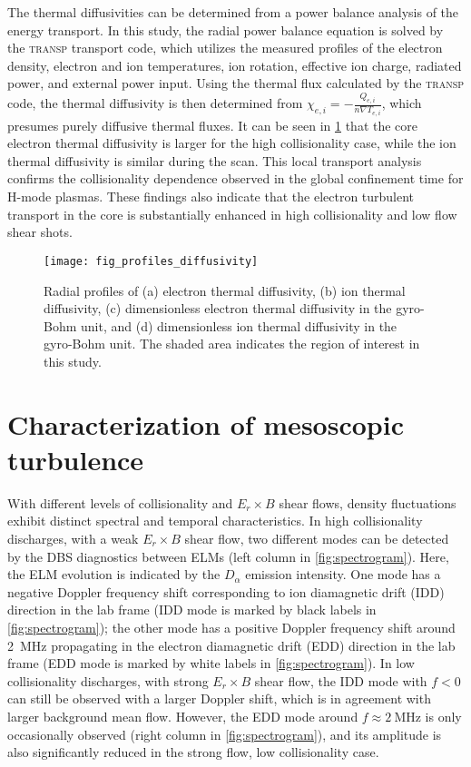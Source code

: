 \documentclass[english,aip,pop,superscriptaddress,preprint,letterpaper]{revtex4-2}
\begin{document}
The thermal diffusivities can be determined from a power balance analysis of the energy transport.
In this study, the radial power balance equation is solved by the \textsc{transp} transport code,\cite{pankinTokamakMonteCarlo2004} which utilizes the measured profiles of the electron density, electron and ion temperatures, ion rotation, effective ion charge, radiated power, and external power input.
Using the thermal flux calculated by the \textsc{transp} code, the thermal diffusivity is then determined from $ \chi_{e,i} = -\frac{Q_{e,i}}{n\nabla T_{e,i}}$, which presumes purely diffusive thermal fluxes.
It can be seen in \cref{fig:profiles_diffusivity} that the core electron thermal diffusivity is larger for the high collisionality case, while the ion thermal diffusivity is similar during the scan.
This local transport analysis confirms the collisionality dependence observed in the global confinement time for H-mode plasmas.\cite{pettyScalingHeatTransport1999}
These findings also indicate that the electron turbulent transport in the core is substantially enhanced in high collisionality and low flow shear shots.

\begin{figure}
    \texttt{[image: fig\_profiles\_diffusivity]}
    \caption{\label{fig:profiles_diffusivity}Radial profiles of (a) electron thermal diffusivity, (b) ion thermal diffusivity, (c) dimensionless electron thermal diffusivity in the gyro-Bohm unit, and (d) dimensionless ion thermal diffusivity in the gyro-Bohm unit. The shaded area indicates the region of interest in this study.}
\end{figure}

\section{Characterization of mesoscopic turbulence\label{sec:turbulence}}

With different levels of collisionality and $E_{r}\times B$ shear flows, density fluctuations exhibit distinct spectral and temporal characteristics.
In high collisionality discharges, with a weak $E_{r}\times B$ shear flow, two different modes can be detected by the DBS diagnostics between ELMs (left column in \cref{fig:spectrogram}).
Here, the ELM evolution is indicated by the $D_{\alpha}$ emission intensity.
One mode has a negative Doppler frequency shift corresponding to ion diamagnetic drift (IDD) direction in the lab frame (IDD mode is marked by black labels in \cref{fig:spectrogram}); the other mode has a positive Doppler frequency shift around \SI{2}{\mega\hertz} propagating in the electron diamagnetic drift (EDD) direction in the lab frame (EDD mode is marked by white labels in \cref{fig:spectrogram}).
In low collisionality discharges, with strong $E_{r}\times B$ shear flow, the IDD mode with $f<0$ can still be observed with a larger Doppler shift, which is in agreement with larger background mean flow.
However, the EDD mode around $f\approx\SI{2}{\mega\hertz}$ is only occasionally observed (right column in \cref{fig:spectrogram}), and its amplitude is also significantly reduced in the strong flow, low collisionality case.
\end{document}
